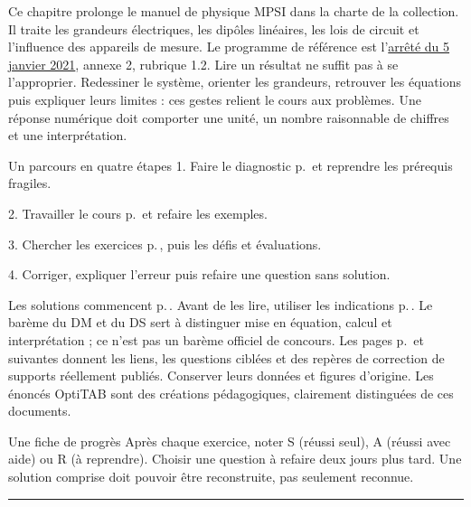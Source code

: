 \thispagestyle{mpsiFront}
Ce chapitre prolonge le manuel de physique MPSI dans la charte de la collection. Il traite les grandeurs électriques, les dipôles linéaires, les lois de circuit et l’influence des appareils de mesure. Le programme de référence est l’\href{https://www.education.gouv.fr/bo/21/Special1/ESRS2035779A.htm}{arrêté du 5 janvier 2021}, annexe 2, rubrique 1.2.
Lire un résultat ne suffit pas à se l’approprier. Redessiner le système, orienter les grandeurs, retrouver les équations puis expliquer leurs limites : ces gestes relient le cours aux problèmes. Une réponse numérique doit comporter une unité, un nombre raisonnable de chiffres et une interprétation.
\begin{loi}{Un parcours en quatre étapes}
1. Faire le diagnostic p.\,\pageref{diagnostic} et reprendre les prérequis fragiles.\par
2. Travailler le cours p.\,\pageref{cours-1} et refaire les exemples.\par
3. Chercher les exercices p.\,\pageref{td1}, puis les défis et évaluations.\par
4. Corriger, expliquer l’erreur puis refaire une question sans solution.
\end{loi}
Les solutions commencent p.\,\pageref{corr-diag}. Avant de les lire, utiliser les indications p.\,\pageref{indices}. Le barème du DM et du DS sert à distinguer mise en équation, calcul et interprétation ; ce n’est pas un barème officiel de concours.
Les pages p.\,\pageref{sources-1} et suivantes donnent les liens, les questions ciblées et des repères de correction de supports réellement publiés. Conserver leurs données et figures d’origine. Les énoncés OptiTAB sont des créations pédagogiques, clairement distinguées de ces documents.
\begin{methode}{Une fiche de progrès}
Après chaque exercice, noter S (réussi seul), A (réussi avec aide) ou R (à reprendre). Choisir une question à refaire deux jours plus tard. Une solution comprise doit pouvoir être reconstruite, pas seulement reconnue.
\end{methode}


\thispagestyle{mpsiFront}
\begingroup\setlength{\parskip}{0pt}\fontsize{10}{13.5}\selectfont
{}

\endgroup
\vspace{2mm}\hrule\vspace{2mm}



